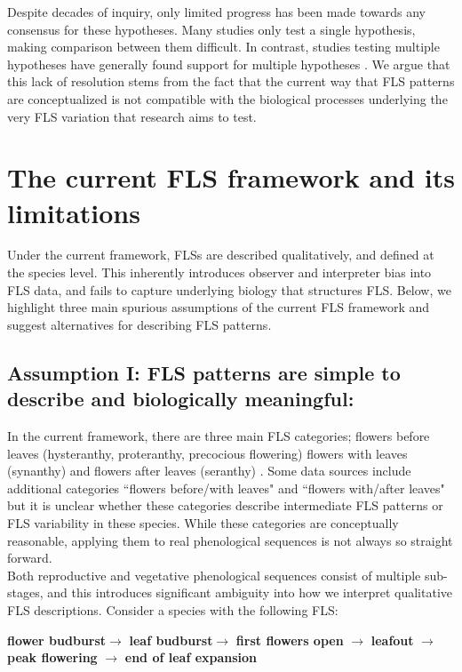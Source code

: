 \documentclass{article}
\begin{document}
\noindent Despite decades of inquiry, only limited progress has been made towards any consensus for these hypotheses. Many studies only test a single hypothesis, making comparison between them difficult. In contrast, studies testing multiple hypotheses have generally found support for multiple hypotheses \citep[see][]{Bolmgren2003,Gougherty2018}. We argue that this lack of resolution stems from the fact that the current way that FLS patterns are conceptualized is not compatible with the biological processes underlying the very FLS variation that research aims to test.

\section*{The current FLS framework and its limitations}
Under the current framework, FLSs are described qualitatively, and defined at the species level. This inherently introduces observer and interpreter bias into FLS data, and fails to capture underlying biology that structures FLS. Below, we highlight three main spurious assumptions of the current FLS framework and suggest alternatives for describing FLS patterns.
\subsection*{Assumption I: FLS patterns are simple to describe and biologically meaningful:}
In the current framework, there are three main FLS categories; flowers before leaves (hysteranthy, proteranthy, precocious flowering) flowers with leaves (synanthy) and flowers after leaves (seranthy) \citep{Lamont2011, Heinig1899}. Some data sources \citep[e.g.][]{Burns1990,Barnes2004} include additional categories ``flowers before/with leaves" and ``flowers with/after leaves" but it is unclear whether these categories describe intermediate FLS patterns or FLS variability in these species. While these categories are conceptually reasonable, applying them to real phenological sequences is not always so straight forward.\\

\noindent Both reproductive and vegetative phenological sequences consist of multiple sub-stages, and this introduces significant ambiguity into how we interpret qualitative FLS descriptions. Consider a species with the following FLS:\\

\begin{center}
\textbf{flower budburst}$\rightarrow$ \textbf{leaf budburst}$\rightarrow$ \textbf{first flowers open} $\rightarrow$ \textbf{leafout} $\rightarrow$ \textbf{peak flowering} $\rightarrow$ \textbf{end of leaf expansion} \\
\end{center}
\end{document}
